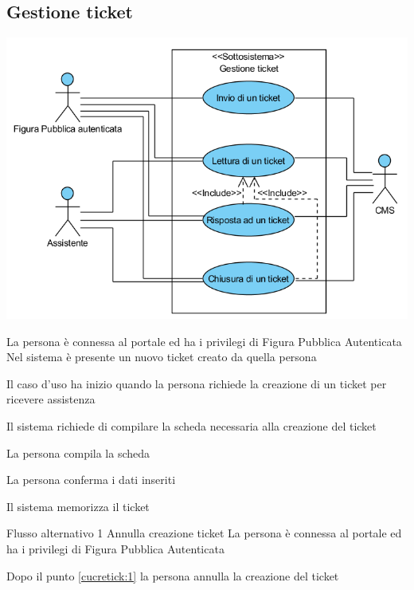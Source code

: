 \subsection{Gestione ticket}
\begin{center}
   \includegraphics[width=\textwidth]{assets/visualParadigm/GestioneTicket}
\end{center}
{}
{La persona è connessa al portale ed ha i privilegi di Figura Pubblica Autenticata}
{Nel sistema è presente un nuovo ticket creato da quella persona}
{\begin{enumCU}
	\item Il caso d'uso ha inizio quando la persona richiede la creazione di un ticket per ricevere assistenza
	\item Il sistema richiede di compilare la scheda necessaria alla creazione del ticket
	\item La persona compila la scheda\label{cucretick:1}
	\item La persona conferma i dati inseriti
	\item Il sistema memorizza il ticket
\end{enumCU}}
%
{Flusso alternativo 1}%
{Annulla creazione ticket}%
{La persona è connessa al portale ed ha i privilegi di Figura Pubblica Autenticata}%
{\postNulle}%
{\begin{enumCU}
		\item Dopo il punto \ref{cucretick:1} la persona annulla la creazione del ticket
	\end{enumCU}}%

